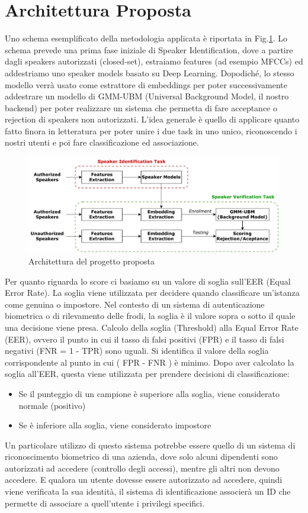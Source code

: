 \section{Architettura Proposta}
Uno schema esemplificato della metodologia applicata è riportata in Fig.\ref{fig:architettura}. 
Lo schema prevede una prima fase iniziale di Speaker Identification, dove a partire dagli speakers autorizzati (closed-set), estraiamo
features (ad esempio MFCCs) ed addestriamo uno speaker models basato su Deep Learning. Dopodiché, lo stesso modello verrà usato come estrattore di embeddings
per poter successivamente addestrare un modello di GMM-UBM (Universal Background Model, il nostro backend) per poter realizzare un sistema che permetta di fare
acceptance o rejection di speakers non autorizzati. L'idea generale è quello di applicare quanto fatto finora in letteratura per poter unire i due task in uno unico,
riconoscendo i nostri utenti e poi fare classificazione ed associazione.
\begin{figure}[ht]
    \centering
    \includegraphics[width=1.0\textwidth]{./architettura.pdf}
    \caption{Architettura del progetto proposta}
    \label{fig:architettura}
\end{figure}
Per quanto riguarda lo score ci basiamo su un valore di soglia sull'EER (Equal Error Rate). La soglia viene utilizzata per decidere quando classificare un'istanza come genuina o impostore. Nel contesto di un sistema di autenticazione biometrica o di rilevamento delle frodi, la soglia è il valore sopra o sotto il quale una decisione viene presa.
Calcolo della soglia (Threshold) alla Equal Error Rate (EER), ovvero il punto in cui il tasso di falsi positivi (FPR) e il tasso di falsi negativi (FNR = 1 - TPR) sono uguali. Si identifica il valore della soglia corrispondente al punto in cui ( FPR - FNR ) è minimo.
Dopo aver calcolato la soglia all'EER, questa viene utilizzata per prendere decisioni di classificazione:
\begin{itemize}
    \item Se il punteggio di un campione è superiore alla soglia, viene considerato normale (positivo)
    \item Se è inferiore alla soglia, viene considerato impostore
\end{itemize}
Un particolare utilizzo di questo sistema potrebbe essere quello di un sistema di riconoscimento biometrico di una azienda, dove solo alcuni dipendenti
sono autorizzati ad accedere (controllo degli accessi), mentre gli altri non devono accedere. E qualora un utente dovesse essere autorizzato ad accedere,
quindi viene verificata la sua identità, il sistema di identificazione associerà un ID che permette di associare a quell'utente i privilegi specifici. \\